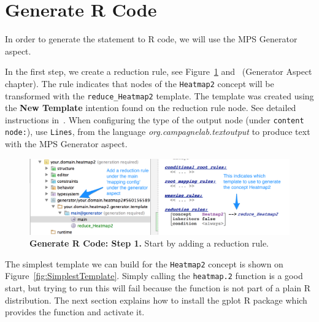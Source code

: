 \section{Generate R Code}
In order to generate the statement to R code, we will use the MPS Generator aspect. 

In the first step, we create a reduction rule, see Figure~\ref{fig:GeneratorHowToStep1} and~\cite{campagne2014mps} (Generator Aspect chapter). The rule indicates that nodes of the \texttt{Heatmap2} concept will be transformed with the \texttt{reduce\_Heatmap2} template. The template was created using the \textbf{New Template} intention found on the reduction rule node. See detailed instructions in~\cite{campagne2014mps}. When configuring the type of the output node (under \texttt{content node:}), use \texttt{Lines}, from the language \textit{org.campagnelab.textoutput} to produce text with the MPS Generator aspect.

\begin{figure}[h!tbp]
  \centering
  \includegraphics[width=\figWidthWide]{figures/GeneratorHowToStep1.png}
\caption[Generate R Code: Step 1.]{\textbf{Generate R Code: Step 1.} Start by adding a reduction rule.}
\label{fig:GeneratorHowToStep1}
\end{figure}

The simplest template we can build for the \texttt{Heatmap2} concept is shown on Figure~\ref{fig:SimplestTemplate}. Simply calling the \texttt{heatmap.2} function is a good start, but trying to run this will fail because the function is not part of a plain R distribution. The next section explains how to install the gplot R package which provides the function and activate it. 

